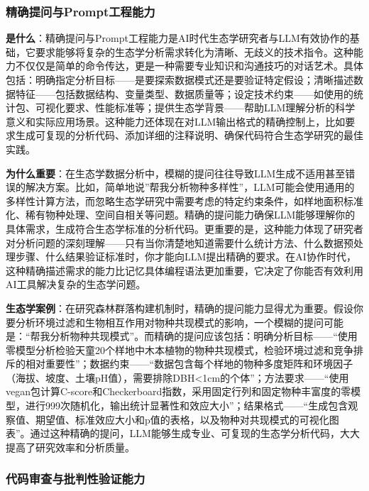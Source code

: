 \documentclass[
]{book}
\begin{document}
\hypertarget{ux7cbeux786eux63d0ux95eeux4e0epromptux5de5ux7a0bux80fdux529b}{%
\subsubsection{精确提问与Prompt工程能力}\label{ux7cbeux786eux63d0ux95eeux4e0epromptux5de5ux7a0bux80fdux529b}}

\textbf{是什么}：精确提问与Prompt工程能力是AI时代生态学研究者与LLM有效协作的基础，它要求能够将复杂的生态学分析需求转化为清晰、无歧义的技术指令。这种能力不仅仅是简单的命令传达，更是一种需要专业知识和沟通技巧的对话艺术。具体包括：明确指定分析目标------是要探索数据模式还是要验证特定假设；清晰描述数据特征------包括数据结构、变量类型、数据质量等；设定技术约束------如使用的统计包、可视化要求、性能标准等；提供生态学背景------帮助LLM理解分析的科学意义和实际应用场景。这种能力还体现在对LLM输出格式的精确控制上，比如要求生成可复现的分析代码、添加详细的注释说明、确保代码符合生态学研究的最佳实践。

\textbf{为什么重要}：在生态学数据分析中，模糊的提问往往导致LLM生成不适用甚至错误的解决方案。比如，简单地说''帮我分析物种多样性''，LLM可能会使用通用的多样性计算方法，而忽略生态学研究中需要考虑的特定约束条件，如样地面积标准化、稀有物种处理、空间自相关等问题。精确的提问能力确保LLM能够理解你的具体需求，生成符合生态学标准的分析代码。更重要的是，这种能力体现了研究者对分析问题的深刻理解------只有当你清楚地知道需要什么统计方法、什么数据预处理步骤、什么结果验证标准时，你才能向LLM提出精确的要求。在AI协作时代，这种精确描述需求的能力比记忆具体编程语法更加重要，它决定了你能否有效利用AI工具解决复杂的生态学问题。

\textbf{生态学案例}：在研究森林群落构建机制时，精确的提问能力显得尤为重要。假设你要分析环境过滤和生物相互作用对物种共现模式的影响，一个模糊的提问可能是：``帮我分析物种共现模式''。而精确的提问应该包括：明确分析目标------``使用零模型分析检验天童20个样地中木本植物的物种共现模式，检验环境过滤和竞争排斥的相对重要性''；数据约束------``数据包含每个样地的物种多度矩阵和环境因子（海拔、坡度、土壤pH值），需要排除DBH\textless1cm的个体''；方法要求------``使用vegan包计算C-score和Checkerboard指数，采用固定行列和固定物种丰富度的零模型，进行999次随机化，输出统计显著性和效应大小''；结果格式------``生成包含观察值、期望值、标准效应大小和p值的表格，以及物种对共现模式的可视化图表''。通过这种精确的提问，LLM能够生成专业、可复现的生态学分析代码，大大提高了研究效率和分析质量。

\hypertarget{ux4ee3ux7801ux5ba1ux67e5ux4e0eux6279ux5224ux6027ux9a8cux8bc1ux80fdux529b}{%
\subsubsection{代码审查与批判性验证能力}\label{ux4ee3ux7801ux5ba1ux67e5ux4e0eux6279ux5224ux6027ux9a8cux8bc1ux80fdux529b}}
\end{document}
